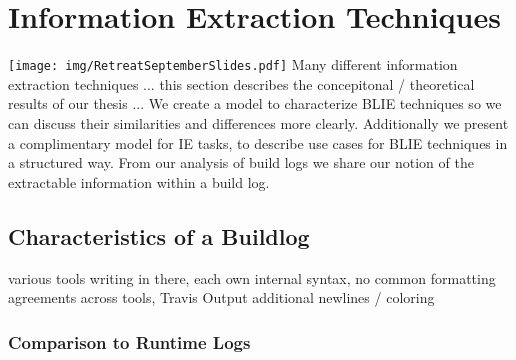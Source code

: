 \documentclass[\myrootdir/main.tex]{subfiles}
\begin{document}
\chapter{Information Extraction Techniques}
\label{models}
\texttt{[image: img/RetreatSeptemberSlides.pdf]}
Many different information extraction techniques ... this section describes the concepitonal / theoretical results of our thesis ... 
We create a model to characterize BLIE techniques so we can discuss their similarities and differences more clearly. 
Additionally we present a complimentary model for IE tasks, to describe use cases for BLIE techniques in a structured way.
From our analysis of build logs we share our notion of the extractable information within a build log.

\section{Characteristics of a Buildlog}
various tools writing in there, each own internal syntax, no common formatting agreements across tools, Travis Output additional newlines / coloring

\subsection{Comparison to Runtime Logs}
\end{document}
